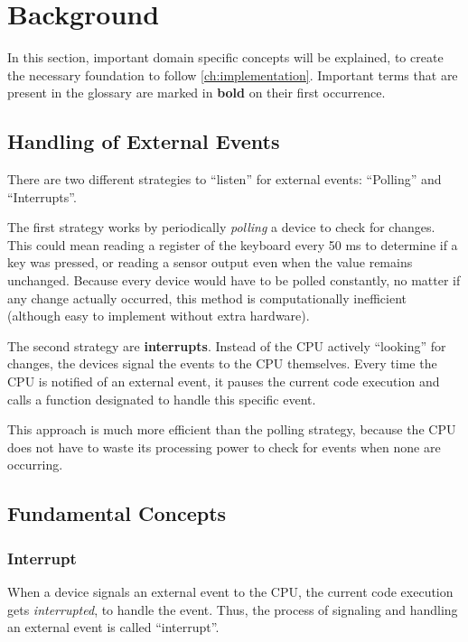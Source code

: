 \chapter{Background}
\label{ch:background}

In this section, important domain specific concepts will be explained, to create the necessary
foundation to follow \autoref{ch:implementation}. Important terms that are present in the glossary
are marked in \textbf{bold} on their first occurrence.

\clearpage

\section{Handling of External Events}
\label{sec:eventhandling}

There are two different strategies to ``listen'' for external events: ``Polling'' and
``Interrupts''.

The first strategy works by periodically \textit{polling} a device to check for changes. This could
mean reading a register of the keyboard every 50 ms to determine if a key was pressed, or reading a
sensor output even when the value remains unchanged. Because every device would have to be polled
constantly, no matter if any change actually occurred, this method is computationally inefficient
(although easy to implement without extra hardware).

The second strategy are \textbf{\glspl{interrupt}}. Instead of the CPU actively ``looking'' for
changes, the devices signal the events to the CPU themselves. Every time the CPU is notified of an
external event, it pauses the current code execution and calls a function designated to handle this
specific event.

This approach is much more efficient than the polling strategy, because the CPU does not have to
waste its processing power to check for events when none are occurring.

\section{Fundamental Concepts}
\label{sec:fundamentals}

\subsection{Interrupt}
\label{subsec:interrupt}

When a device signals an external event to the CPU, the current code execution gets
\textit{interrupted}, to handle the event. Thus, the process of signaling and handling an external
event is called ``interrupt''.

